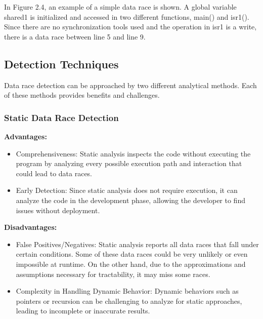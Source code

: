 \documentclass[
fancyheadings, %
%
%
]{stsreprt}
\begin{document}
{In Figure 2.4, an example of a simple data race is shown. A global variable shared1 is initialized and accessed in two different functions, main() and isr1(). Since there are no synchronization tools used and the operation in isr1 is a write, there is a data race between line 5 and line 9.

\subsection{Detection Techniques}

Data race detection can be approached by two different analytical methods. Each of these methods provides benefits and challenges.

\subsubsection{Static Data Race Detection \cite{wang2020}}
\textbf{Advantages:}
\begin{itemize}
	\item Comprehensiveness: Static analysis inspects the code without executing the program by analyzing every possible execution path and interaction that could lead to data races. 
	\item Early Detection: Since static analysis does not require execution, it can analyze the code in the development phase, allowing the developer to find issues without deployment.
\end{itemize}
\textbf{Disadvantages:}
\begin{itemize}
	\item False Positives/Negatives: Static analysis reports all data races that fall under certain conditions. Some of these data races could be very unlikely or even impossible at runtime. On the other hand, due to the approximations and assumptions necessary for tractability, it may miss some races.
	\item Complexity in Handling Dynamic Behavior: Dynamic behaviors such as pointers or recursion can be challenging to analyze for static approaches, leading to incomplete or inaccurate results.
\end{itemize}

}
\end{document}
